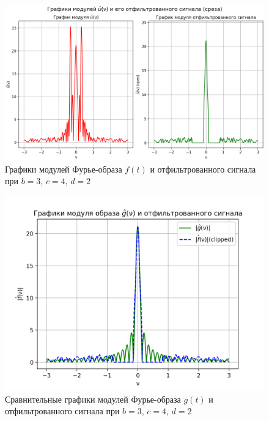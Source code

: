 \begin{figure}[ht!]
    \centering
    \includegraphics[scale=0.55]{media/1 task/specific_freq/Fourier_Image_3_4_2_-0,8:-0,153.png}
    \caption{Графики модулей Фурье-образа $f(t)$ и отфильтрованного сигнала при $b=3$,  $c=4$,  $d=2$}
    \label{fig:four_3_4_2}
\end{figure}

\begin{figure}[ht!]
    \centering
    \includegraphics[scale=0.55]{media/1 task/specific_freq/Fourier_Image_Comparison_3_4_2_-0,8:-0,153.png}
    \caption{Сравнительные графики модулей Фурье-образа $g(t)$ и отфильтрованного сигнала при  $b=3$,  $c=4$,  $d=2$}
    \label{fig:fourc_3_4_2}
\end{figure}

\clearpage

